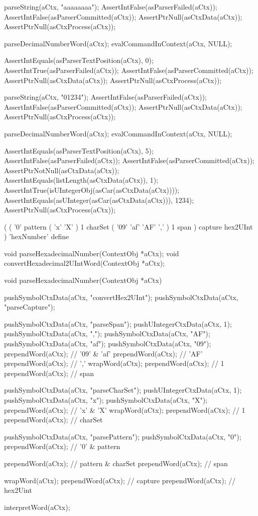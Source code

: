 \startCTest
  parseString(aCtx, "aaaaaaaa");
  AssertIntFalse(asParserFailed(aCtx));
  AssertIntFalse(asParserCommitted(aCtx));
  AssertPtrNull(asCtxData(aCtx));
  AssertPtrNull(asCtxProcess(aCtx));
  
  parseDecimalNumberWord(aCtx);
  evalCommandInContext(aCtx, NULL);
  
  AssertIntEquals(asParserTextPosition(aCtx), 0);
  AssertIntTrue(asParserFailed(aCtx));
  AssertIntFalse(asParserCommitted(aCtx));
  AssertPtrNull(asCtxData(aCtx));
  AssertPtrNull(asCtxProcess(aCtx));
\stopCTest
\stopTestCase

\startCTest
  parseString(aCtx, "01234");
  AssertIntFalse(asParserFailed(aCtx));
  AssertIntFalse(asParserCommitted(aCtx));
  AssertPtrNull(asCtxData(aCtx));
  AssertPtrNull(asCtxProcess(aCtx));
  
  parseDecimalNumberWord(aCtx);
  evalCommandInContext(aCtx, NULL);

  AssertIntEquals(asParserTextPosition(aCtx), 5);
  AssertIntFalse(asParserFailed(aCtx));
  AssertIntFalse(asParserCommitted(aCtx));
  AssertPtrNotNull(asCtxData(aCtx));
  AssertIntEquals(listLength(asCtxData(aCtx)), 1);
  AssertIntTrue(isUIntegerObj(asCar(asCtxData(aCtx))));
  AssertIntEquals(asUInteger(asCar(asCtxData(aCtx))), 1234);  
  AssertPtrNull(asCtxProcess(aCtx));
\stopCTest
\stopTestCase
\stopTestSuite

\startTestSuite[parseHexNumberWord]

\starttyping
(
  (
    '0' pattern
    ( 'x' 'X' ) 1 charSet
    ( '09' 'af' 'AF' ',' ) 1 span
  ) capture hex2UInt
) 'hexNumber' define
\stoptyping

\startCHeader
void parseHexadecimalNumber(ContextObj *aCtx);
void convertHexadecimal2UIntWord(ContextObj *aCtx);
\stopCHeader

\startCCode
void parseHexadecimalNumber(ContextObj *aCtx) {

  pushSymbolCtxData(aCtx, "convertHex2UInt");
  pushSymbolCtxData(aCtx, "parseCapture");

  pushSymbolCtxData(aCtx, "parseSpan");
  pushUIntegerCtxData(aCtx, 1);
  pushSymbolCtxData(aCtx, ",");
  pushSymbolCtxData(aCtx, "AF");
  pushSymbolCtxData(aCtx, "af");
  pushSymbolCtxData(aCtx, "09");
  prependWord(aCtx); // '09' & 'af'
  prependWord(aCtx); // 'AF'
  prependWord(aCtx); // ','
  wrapWord(aCtx);
  prependWord(aCtx); // 1
  prependWord(aCtx); // span

  pushSymbolCtxData(aCtx, "parseCharSet");
  pushUIntegerCtxData(aCtx, 1);
  pushSymbolCtxData(aCtx, "x");
  pushSymbolCtxData(aCtx, "X");
  prependWord(aCtx); // 'x' & 'X'
  wrapWord(aCtx);
  prependWord(aCtx); // 1
  prependWord(aCtx); // charSet

  pushSymbolCtxData(aCtx, "parsePattern");
  pushSymbolCtxData(aCtx, "0");
  prependWord(aCtx); // '0' & pattern
  
  prependWord(aCtx); // pattern & charSet
  prependWord(aCtx); // span
  
  wrapWord(aCtx);
  prependWord(aCtx); // capture
  prependWord(aCtx); // hex2Uint
  
  interpretWord(aCtx);
}

